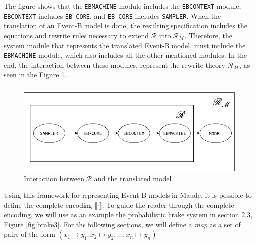 The figure shows that the \texttt{EBMACHINE} module includes the \texttt{EBCONTEXT} module, \texttt{EBCONTEXT} includes \texttt{EB-CORE}, and \texttt{EB-CORE} includes  \texttt{SAMPLER}. When the translation of an Event-B model is done, the resulting specification includes the equations and rewrite rules necessary to extend $\mathscr{R}$ into $\mathscr{R}_\mathscr{M}$. Therefore, the system module that represents the translated Event-B model, must include the \texttt{EBMACHINE} module, which also includes all the other mentioned modules. In the end, the interaction between these modules, represent the rewrite theory $\mathscr{R}_\mathscr{M}$, as seen in the Figure \ref{fig:E2M2}.
\begin{figure}[h]
    \centering
    \includegraphics[scale = 0.5]{images/E2M2.png}
    \caption{Interaction between $\mathscr{R}$ and the translated model}
    \label{fig:E2M2}
\end{figure}
Using this framework for representing Event-B models in Maude, it is possible to define the complete encoding $\llbracket \cdot \rrbracket$. To guide the reader through the complete encoding, we will use as an example the probabilistic brake system in section 2.3, Figure \ref{fig:brake3}. For the following sections, we will define a \textit{map} as a set of pairs of the form $(x_1 \mapsto y_1, x_2 \mapsto y_2, ... , x_n \mapsto y_n)$

